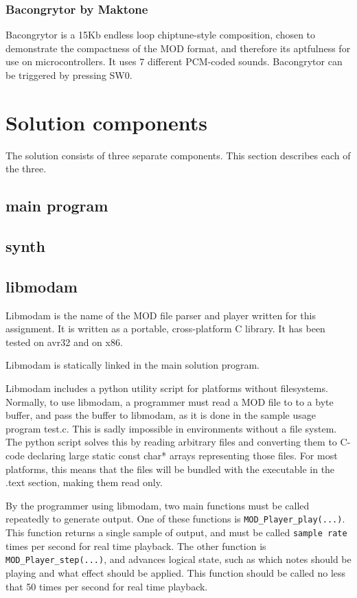 \subsubsection{Bacongrytor by Maktone}
Bacongrytor is a 15Kb endless loop chiptune-style composition, chosen to demonstrate the compactness of the MOD format, and therefore its aptfulness for use on microcontrollers.
It uses 7 different PCM-coded sounds.
Bacongrytor can be triggered by pressing SW0.


\section{Solution components}

The solution consists of three separate components. This section describes each of the three.

\subsection{main program}
\subsection{synth}

\subsection{libmodam}

Libmodam is the name of the MOD file parser and player written for this assignment.
It is written as a portable, cross-platform C library.
It has been tested on avr32 and on x86.

Libmodam is statically linked in the main solution program.

Libmodam includes a python utility script for platforms without filesystems.
Normally, to use libmodam, a programmer must read a MOD file to to a byte buffer, and pass the buffer to libmodam, as it is done in the sample usage program test.c.
This is sadly impossible in environments without a file system.
The python script solves this by reading arbitrary files and converting them to C-code declaring large static const char* arrays representing those files.
For most platforms, this means that the files will be bundled with the executable in the .text section, making them read only.

By the programmer using libmodam, two main functions must be called repeatedly to generate output.
One of these functions is \texttt{MOD\_Player\_play(...)}.
This function returns a single sample of output, and must be called \texttt{sample rate} times per second for real time playback.
The other function is \texttt{MOD\_Player\_step(...)}, and advances logical state, such as which notes should be playing and what effect should be applied.
This function should be called no less that 50 times per second for real time playback.

